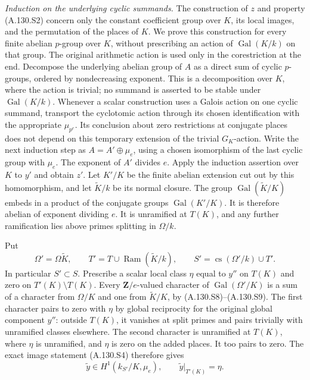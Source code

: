 \emph{Induction on the underlying cyclic summands.}
The construction of \(z\) and property (A.130.S2) concern
only the constant coefficient group over \(K\), its local
images, and the permutation of the places of \(K\).
We prove this construction for every finite abelian
\(p\)-group over \(K\), without prescribing an action of
\(\operatorname{Gal}(K/k)\) on that group.
The original arithmetic action is used only in the
corestriction at the end.
Decompose the underlying abelian group of \(A\) as a direct
sum of cyclic \(p\)-groups, ordered by nondecreasing exponent.
This is a decomposition over \(K\), where the action is trivial;
no summand is asserted to be stable under
\(\operatorname{Gal}(K/k)\).
Whenever a scalar construction uses a Galois action on
one cyclic summand, transport the cyclotomic action
through its chosen identification with the appropriate
\(\mu_{p^e}\).  Its conclusion about zero restrictions
at conjugate places does not depend on this temporary
extension of the trivial \(G_K\)-action.
Write the next induction step as
\(A=A'\oplus\mu_e\), using a chosen isomorphism of the last
cyclic group with \(\mu_e\).  The exponent of \(A'\) divides \(e\).
Apply the induction assertion over \(K\) to \(y'\) and obtain
\(z'\).  Let \(K'/K\) be the finite abelian extension cut out
by this homomorphism, and let \(\widetilde K/k\) be its
normal closure.  The group
\(\operatorname{Gal}(\widetilde K/K)\) embeds in a product
of the conjugate groups \(\operatorname{Gal}(K'/K)\).
It is therefore abelian of exponent dividing \(e\).
It is unramified at \(T(K)\), and any further ramification
lies above primes splitting in \(\Omega/k\).

Put
\[
 \Omega'=\Omega\widetilde K,\qquad
 T'=T\cup\operatorname{Ram}(\widetilde K/k),\qquad
 S'=\operatorname{cs}(\Omega'/k)\cup T'.
 \tag{A.130.S10}
\]
In particular \(S'\subset S\).
Prescribe a scalar local class \(\eta\) equal to \(y''\)
on \(T(K)\) and zero on \(T'(K)\setminus T(K)\).
Every \(\mathbf Z/e\)-valued character of
\(\operatorname{Gal}(\Omega'/K)\) is a sum of a character
from \(\Omega/K\) and one from \(\widetilde K/K\), by
(A.130.S8)--(A.130.S9).
The first character pairs to zero with \(\eta\) by global
reciprocity for the original global component \(y''\):
outside \(T(K)\), it vanishes at split primes and pairs
trivially with unramified classes elsewhere.
The second character is unramified at \(T(K)\), where
\(\eta\) is unramified, and \(\eta\) is zero on the added places.
It too pairs to zero.
The exact image statement (A.130.S4) therefore gives
\[
       \widetilde y\in H^1(k_{S'}/K,\mu_e),
                 \qquad \widetilde y|_{T'(K)}=\eta .
 \tag{A.130.S11}
\]

